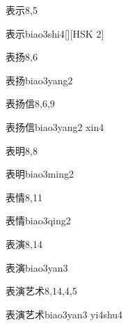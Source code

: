 \begin{entry}{表示}{8,5}
  \begin{phonetics}{表示}{biao3shi4}[][HSK 2]
  \end{phonetics}
\end{entry}

\begin{entry}{表扬}{8,6}
  \begin{phonetics}{表扬}{biao3yang2}
  \end{phonetics}
\end{entry}

\begin{entry}{表扬信}{8,6,9}
  \begin{phonetics}{表扬信}{biao3yang2 xin4}
  \end{phonetics}
\end{entry}

\begin{entry}{表明}{8,8}
  \begin{phonetics}{表明}{biao3ming2}
  \end{phonetics}
\end{entry}

\begin{entry}{表情}{8,11}
  \begin{phonetics}{表情}{biao3qing2}
  \end{phonetics}
\end{entry}

\begin{entry}{表演}{8,14}
  \begin{phonetics}{表演}{biao3yan3}
  \end{phonetics}
\end{entry}

\begin{entry}{表演艺术}{8,14,4,5}
  \begin{phonetics}{表演艺术}{biao3yan3 yi4shu4}
  \end{phonetics}
\end{entry}

